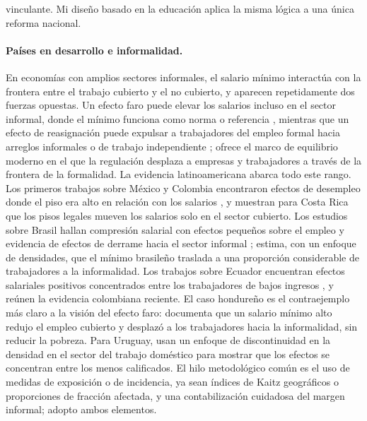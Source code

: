 vinculante. Mi diseño basado en la educación aplica la misma lógica a una única reforma nacional.

\paragraph{Países en desarrollo e informalidad.} En economías con amplios sectores informales, el salario mínimo interactúa con la frontera entre el trabajo cubierto y el no cubierto, y aparecen repetidamente dos fuerzas opuestas. Un efecto faro puede elevar los salarios incluso en el sector informal, donde el mínimo funciona como norma o referencia \citep{lemos_2009, bosch_manacorda_2010, maloney_nunez_2004}, mientras que un efecto de reasignación puede expulsar a trabajadores del empleo formal hacia arreglos informales o de trabajo independiente \citep{ham_2018_honduras}; \citet{ulyssea_2018} ofrece el marco de equilibrio moderno en el que la regulación desplaza a empresas y trabajadores a través de la frontera de la formalidad. La evidencia latinoamericana abarca todo este rango. Los primeros trabajos sobre México y Colombia encontraron efectos de desempleo donde el piso era alto en relación con los salarios \citep{bell_1997}, y \citet{gindling_terrell_2007} muestran para Costa Rica que los pisos legales mueven los salarios solo en el sector cubierto. Los estudios sobre Brasil hallan compresión salarial con efectos pequeños sobre el empleo y evidencia de efectos de derrame hacia el sector informal \citep{lemos_2009, lemos_2004}; \citet{jales_2018} estima, con un enfoque de densidades, que el mínimo brasileño traslada a una proporción considerable de trabajadores a la informalidad. Los trabajos sobre Ecuador encuentran efectos salariales positivos concentrados entre los trabajadores de bajos ingresos \citep{wong_2019_ecuador}, y \citet{arango_2022_colombia} reúnen la evidencia colombiana reciente. El caso hondureño es el contraejemplo más claro a la visión del efecto faro: \citet{ham_2018_honduras} documenta que un salario mínimo alto redujo el empleo cubierto y desplazó a los trabajadores hacia la informalidad, sin reducir la pobreza. Para Uruguay, \citet{katzkowicz_2021_uruguay} usan un enfoque de discontinuidad en la densidad en el sector del trabajo doméstico para mostrar que los efectos se concentran entre los menos calificados. El hilo metodológico común es el uso de medidas de exposición o de incidencia, ya sean índices de Kaitz geográficos o proporciones de fracción afectada, y una contabilización cuidadosa del margen informal; adopto ambos elementos.

